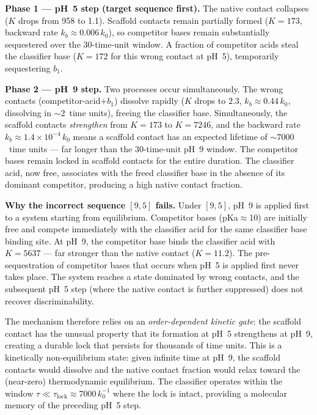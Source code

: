 \documentclass[10pt,twocolumn]{article}
\begin{document}
\textbf{Phase 1 — pH~5 step (target sequence first).}
The native contact collapses ($K$ drops from 958 to 1.1).
Scaffold contacts remain partially formed ($K=173$, backward rate $k_b\approx 0.006\,k_0$), so competitor bases remain substantially sequestered over the 30-time-unit window.
A fraction of competitor acids steal the classifier base ($K=172$ for this wrong contact at pH~5), temporarily sequestering $b_1$.

\textbf{Phase 2 — pH~9 step.}
Two processes occur simultaneously.
The wrong contacts (competitor-acid$+b_1$) dissolve rapidly ($K$ drops to $2.3$, $k_b \approx 0.44\,k_0$, dissolving in $\sim 2$~time units), freeing the classifier base.
Simultaneously, the scaffold contacts \emph{strengthen} from $K=173$ to $K=7246$, and the backward rate $k_b \approx 1.4 \times 10^{-4}\,k_0$ means a scaffold contact has an expected lifetime of $\sim 7000$~time units — far longer than the 30-time-unit pH~9 window.
The competitor bases remain locked in scaffold contacts for the entire duration.
The classifier acid, now free, associates with the freed classifier base in the absence of its dominant competitor, producing a high native contact fraction.

\textbf{Why the incorrect sequence $[9, 5]$ fails.}
Under $[9,5]$, pH~9 is applied first to a system starting from equilibrium.
Competitor bases (pKa$\approx$10) are initially free and compete immediately with the classifier acid for the same classifier base binding site.
At pH~9, the competitor base binds the classifier acid with $K = 5637$ — far stronger than the native contact ($K=11.2$).
The pre-sequestration of competitor bases that occurs when pH~5 is applied first never takes place.
The system reaches a state dominated by wrong contacts, and the subsequent pH~5 step (where the native contact is further suppressed) does not recover discriminability.

The mechanism therefore relies on an \emph{order-dependent kinetic gate}: the scaffold contact has the unusual property that its formation at pH~5 strengthens at pH~9, creating a durable lock that persists for thousands of time units.
This is a kinetically non-equilibrium state: given infinite time at pH~9, the scaffold contacts would dissolve and the native contact fraction would relax toward the (near-zero) thermodynamic equilibrium.
The classifier operates within the window $\tau \ll \tau_\mathrm{lock} \approx 7000\,k_0^{-1}$ where the lock is intact, providing a molecular memory of the preceding pH~5 step.
\end{document}
